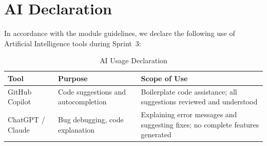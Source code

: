 \documentclass[11pt,a4paper]{article}
\begin{document}
%

\newpage

\section{AI Declaration}

In accordance with the module guidelines, we declare the following use of Artificial Intelligence tools during Sprint~3:

\begin{table}[H]
\centering
\begin{tabularx}{\textwidth}{lXX}
    \toprule
    \textbf{Tool} & \textbf{Purpose} & \textbf{Scope of Use} \\
    \midrule
    GitHub Copilot  & Code suggestions and autocompletion              & Boilerplate code assistance; all suggestions reviewed and understood \\
    ChatGPT / Claude & Bug debugging, code explanation                  & Explaining error messages and suggesting fixes; no complete features generated \\
    \bottomrule
\end{tabularx}
\caption{AI Usage Declaration}
\end{table}
\end{document}
